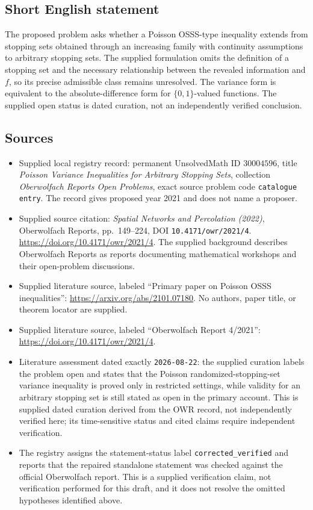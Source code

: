 \documentclass[11pt]{article}
\begin{document}
\subsection{Short English statement}
The proposed problem asks whether a Poisson OSSS-type inequality extends from stopping sets obtained through an increasing family with continuity assumptions to arbitrary stopping sets. The supplied formulation omits the definition of a stopping set and the necessary relationship between the revealed information and \(f\), so its precise admissible class remains unresolved. The variance form is equivalent to the absolute-difference form for \(\{0,1\}\)-valued functions. The supplied open status is dated curation, not an independently verified conclusion.
\subsection{Sources}
\begin{itemize}
\item Supplied local registry record: permanent UnsolvedMath ID \(30004596\), title \emph{Poisson Variance Inequalities for Arbitrary Stopping Sets}, collection \emph{Oberwolfach Reports Open Problems}, exact source problem code \texttt{catalogue entry}. The record gives proposed year 2021 and does not name a proposer.
\item Supplied source citation: \emph{Spatial Networks and Percolation (2022)}, Oberwolfach Reports, pp.~149--224, DOI \texttt{10.4171/owr/2021/4}. \url{https://doi.org/10.4171/owr/2021/4}. The supplied background describes Oberwolfach Reports as reports documenting mathematical workshops and their open-problem discussions.
\item Supplied literature source, labeled ``Primary paper on Poisson OSSS inequalities'': \url{https://arxiv.org/abs/2101.07180}. No authors, paper title, or theorem locator are supplied.
\item Supplied literature source, labeled ``Oberwolfach Report 4/2021'': \url{https://doi.org/10.4171/owr/2021/4}.
\item Literature assessment dated exactly \texttt{2026-08-22}: the supplied curation labels the problem open and states that the Poisson randomized-stopping-set variance inequality is proved only in restricted settings, while validity for an arbitrary stopping set is still stated as open in the primary account. This is supplied dated curation derived from the OWR record, not independently verified here; its time-sensitive status and cited claims require independent verification.
\item The registry assigns the statement-status label \texttt{corrected\_verified} and reports that the repaired standalone statement was checked against the official Oberwolfach report. This is a supplied verification claim, not verification performed for this draft, and it does not resolve the omitted hypotheses identified above.
\end{itemize}
\end{document}
